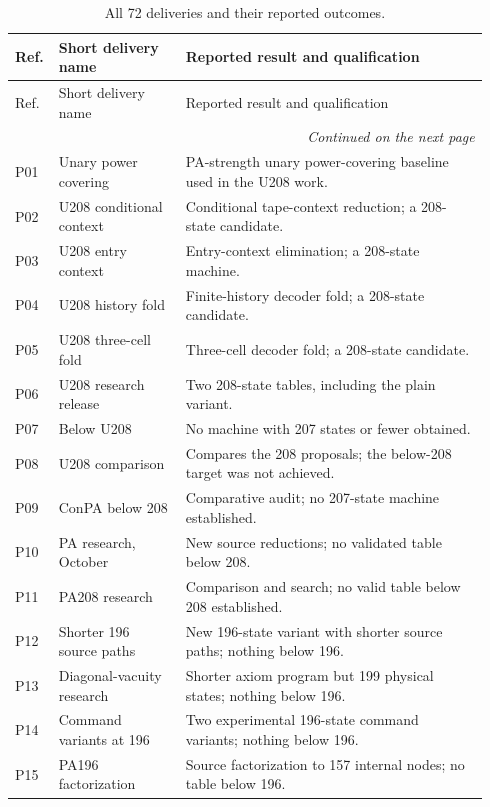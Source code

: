 \begingroup
\footnotesize
\setlength{\LTpre}{0.6\baselineskip}
\setlength{\LTpost}{0.6\baselineskip}
\begin{longtable}{@{}p{0.06\linewidth}p{0.26\linewidth}p{0.62\linewidth}@{}}
\caption{All 72 deliveries and their reported outcomes.}\label{cmp:delivery-table}\\
\toprule
Ref. & Short delivery name & Reported result and qualification\\
\midrule
\endfirsthead
\toprule
Ref. & Short delivery name & Reported result and qualification\\
\midrule
\endhead
\midrule
\multicolumn{3}{r}{\emph{Continued on the next page}}\\
\endfoot
\bottomrule
\endlastfoot
P01 & Unary power covering & PA-strength unary power-covering baseline used in the U208 work. \\
P02 & U208 conditional context & Conditional tape-context reduction; a 208-state candidate. \\
P03 & U208 entry context & Entry-context elimination; a 208-state machine. \\
P04 & U208 history fold & Finite-history decoder fold; a 208-state candidate. \\
P05 & U208 three-cell fold & Three-cell decoder fold; a 208-state candidate. \\
P06 & U208 research release & Two 208-state tables, including the plain variant. \\
P07 & Below U208 & No machine with 207 states or fewer obtained. \\
P08 & U208 comparison & Compares the 208 proposals; the below-208 target was not achieved. \\
P09 & ConPA below 208 & Comparative audit; no 207-state machine established. \\
P10 & PA research, October & New source reductions; no validated table below 208. \\
P11 & PA208 research & Comparison and search; no valid table below 208 established. \\
P12 & Shorter 196 source paths & New 196-state variant with shorter source paths; nothing below 196. \\
P13 & Diagonal-vacuity research & Shorter axiom program but 199 physical states; nothing below 196. \\
P14 & Command variants at 196 & Two experimental 196-state command variants; nothing below 196. \\
P15 & PA196 factorization & Source factorization to 157 internal nodes; no table below 196. \\

\end{longtable}
